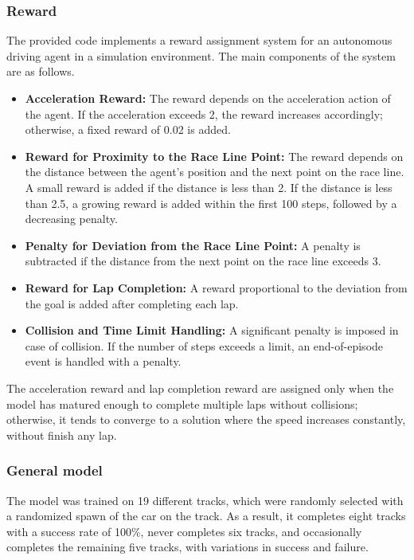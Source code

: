 \documentclass[conference]{IEEEtran}
\begin{document}

%
%
%
\subsubsection{Reward}
The provided code implements a reward assignment system for an autonomous driving agent in a simulation environment.
%
The main components of the system are as follows.

\begin{itemize}
    \item \textbf{Acceleration Reward:}
    The reward depends on the acceleration action of the agent.
    If the acceleration exceeds 2, the reward increases accordingly; otherwise, a fixed reward of 0.02 is added.

    \item \textbf{Reward for Proximity to the Race Line Point:}
    The reward depends on the distance between the agent's position and the next point on the race line.
    A small reward is added if the distance is less than 2.
    If the distance is less than 2.5, a growing reward is added within the first 100 steps, followed by a decreasing penalty.

    \item \textbf{Penalty for Deviation from the Race Line Point:}
    A penalty is subtracted if the distance from the next point on the race line exceeds 3.

    \item \textbf{Reward for Lap Completion:}
    A reward proportional to the deviation from the goal is added after completing each lap.

    \item \textbf{Collision and Time Limit Handling:}
    A significant penalty is imposed in case of collision.
    If the number of steps exceeds a limit, an end-of-episode event is handled with a penalty.

\end{itemize}

The acceleration reward and lap completion reward are assigned only when the model has matured enough to complete multiple laps without collisions; otherwise, it tends to converge to a solution where the speed increases constantly, without finish any lap.

%
%
%
\subsubsection{General model}
The model was trained on 19 different tracks, which were randomly selected with a randomized spawn of the car on the track. As a result, it completes eight tracks with a success rate of 100\%, never completes six tracks, and occasionally completes the remaining five tracks, with variations in success and failure.
\end{document}
